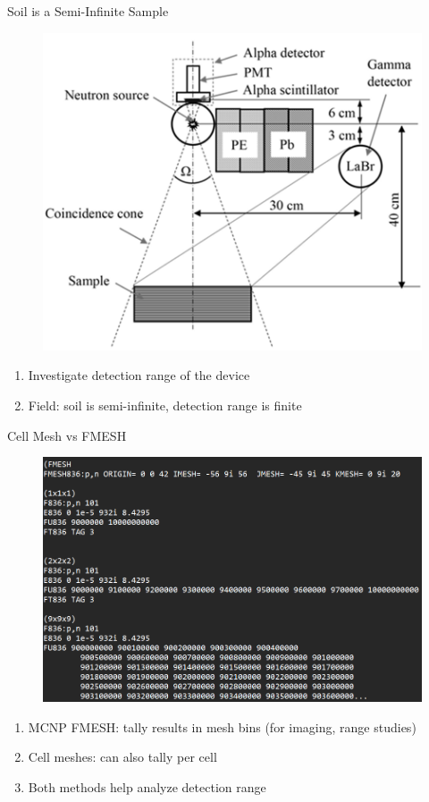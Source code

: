 \documentclass[10pt,hyperref={colorlinks,citecolor=blue,urlcolor=peking_blue,linkcolor=}]{beamer}
\theoremstyle{plain}
\begin{document}
\begin{frame}{Soil is a Semi-Infinite Sample}
\begin{figure}[Field Spectroscopy]
\begin{center}
\includegraphics[width=.5\linewidth]{../Figures/Misc/FieldSpectros.png}
\end{center}
\end{figure}
\begin{enumerate}
\item Investigate detection range of the device
\item Field: soil is semi-infinite, detection range is finite
\end{enumerate}
\end{frame}
\begin{frame}{Cell Mesh vs FMESH}
\begin{figure}[Cell Mesh vs FMESH code]
\begin{center}
\includegraphics[width=.6\linewidth]{../Figures/MCNP/maxfmesh.png}
\end{center}
\end{figure}
\begin{enumerate}
\item MCNP FMESH: tally results in mesh bins (for imaging, range studies)
\item Cell meshes: can also tally per cell
\item Both methods help analyze detection range
\end{enumerate}
\end{frame}
\end{document}
